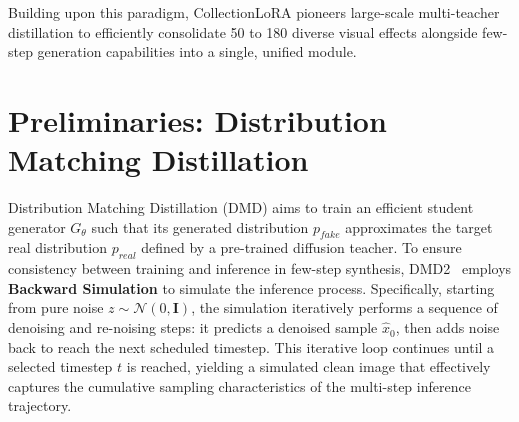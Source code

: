 \documentclass{llmxive}
\begin{document}
Building upon this paradigm, CollectionLoRA pioneers large-scale multi-teacher distillation to efficiently consolidate 50 to 180 diverse visual effects alongside few-step generation capabilities into a single, unified module.
\section{Preliminaries: Distribution Matching Distillation}
\label{sec:preliminaries}

Distribution Matching Distillation (DMD) aims to train an efficient student generator $G_\theta$ such that its generated distribution $p_{fake}$ approximates the target real distribution $p_{real}$ defined by a pre-trained diffusion teacher. To ensure consistency between training and inference in few-step synthesis, DMD2~\cite{dmd2} employs \textbf{Backward Simulation} to simulate the inference process. Specifically, starting from pure noise $z \sim \mathcal{N}(0, \mathbf{I})$, the simulation iteratively performs a sequence of denoising and re-noising steps: it predicts a denoised sample $\hat{x}_0$, then adds noise back to reach the next scheduled timestep. This iterative loop continues until a selected timestep $t$ is reached, yielding a simulated clean image that effectively captures the cumulative sampling characteristics of the multi-step inference trajectory. 
\end{document}
